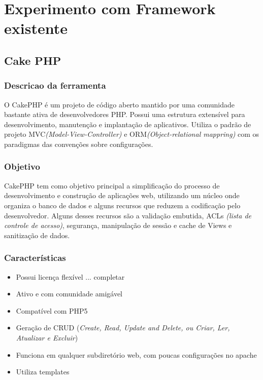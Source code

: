 \chapter{Experimento com Framework existente\label{cap:experimento}}

    \section{Cake PHP\label{sec:cake-php}}
        \subsection{Descricao da ferramenta\label{sub:descricao-cake}}

            O CakePHP é um projeto de código aberto mantido por uma comunidade bastante ativa de desenvolvedores PHP. Possui uma estrutura extensível para desenvolvimento, manutenção e implantação de aplicativos. Utiliza o padrão de projeto MVC\emph{(Model-View-Controller)} e ORM\emph{(Object-relational mappring)} com os paradigmas das convenções sobre configurações.


        \subsection{Objetivo\label{sub:objetivo-cake}}

            CakePHP tem como objetivo principal a simplificação do processo de desenvolvimento e construção de aplicações web, utilizando um núcleo onde organiza o banco de dados e alguns recursos que reduzem a codificação pelo desenvolvedor. Alguns desses recursos são a validação embutida, ACLs \emph{(lista de controle de acesso)}, segurança, manipulação de sessão e cache de Views e sanitização de dados.


        \subsection{Características\label{sub:caracteristicas-cake}}
            \begin{itemize}
                \item Possui licença flexível ... completar
                \item Ativo e com comunidade amigável
                \item Compatível com PHP5
                \item Geração de CRUD (\emph{Create, Read, Update and Delete, ou Criar, Ler, Atualizar e Excluir})
                \item Funciona em qualquer subdiretório web, com poucas configurações no apache
                \item Utiliza templates
            \end{itemize}